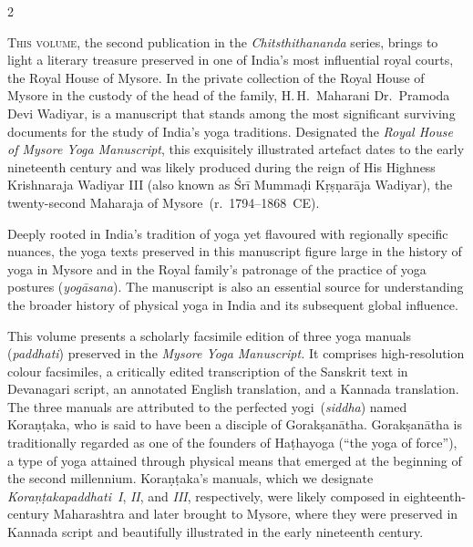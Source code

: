 \null\vspace{0.1cm}

\begin{nohyp}
\begin{eng}
\label{introsec1}
\end{eng}
\vskip 22pt

\begin{multicols*}{2}
\begin{eng}
\lettrine[lines=3,lhang=0.04,nindent=0em]{T}{his volume}, the second publication in the \emph{Chitsthithananda} series, brings to light a literary treasure preserved in one of India's most influential royal courts, the Royal House of Mysore. In the private collection of the Royal House of Mysore in the custody of the head of the family, H.\,H.\ Maharani Dr.\ Pramoda Devi Wadiyar, is a manuscript that stands among the most significant surviving documents for the study of India's yoga traditions. Designated the \emph{Royal House of Mysore Yoga Manuscript}, this exquisitely illustrated artefact dates to the early nineteenth century and was likely produced during the reign of His Highness Krishnaraja Wadiyar III (also known as Śrī Mummaḍi Kṛṣṇarāja Wadiyar), the twenty-second Maharaja of Mysore~(r.~1794--1868~CE).

Deeply rooted in India's tradition of yoga yet flavoured with regionally specific nuances, the yoga texts preserved in this manuscript figure large in the history of yoga in Mysore and in the Royal family's patronage of the practice of yoga postures (\emph{yogāsana}). The manuscript is also an essential source for understanding the broader history of physical yoga in India and its subsequent global influence.

This volume presents a scholarly facsimile edition of three yoga manuals (\emph{paddhati}) preserved in the \emph{Mysore Yoga Manuscript.} It comprises high-resolution colour facsimiles, a critically edited transcription of the Sanskrit text in Devanagari script, an annotated English translation, and a Kannada translation. The three manuals are attributed to the perfected yogi~(\emph{siddha}) named Koraṇṭaka, who is said to have been a disciple of Gorakṣanātha. Gorakṣanātha is traditionally regarded as one of the founders of Haṭhayoga (``the yoga of force''), a type of yoga attained through physical means that emerged at the beginning of the second millennium. Koraṇṭaka's manuals, which we designate \emph{Koraṇṭakapaddhati}~\emph{I}, \emph{II}, and \emph{III}, respectively, were likely composed in eighteenth-century Maharashtra and later brought to Mysore, where they were preserved in Kannada script and beautifully illustrated in the early nineteenth century.


\end{eng}
\end{multicols*}
\end{nohyp}
